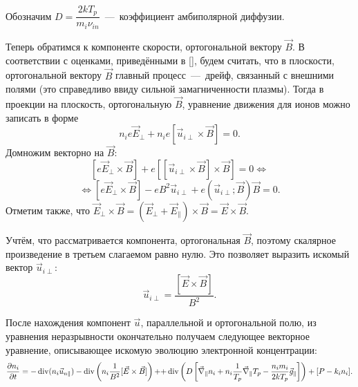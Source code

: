 \documentclass[14pt, a4paper]{extarticle}
\renewcommand{\div}{\operatorname{div}}
\begin{document}
Обозначим $D=\dfrac{2kT_p}{m_i\nu_{in}}$~---~коэффициент амбиполярной диффузии.

Теперь обратимся к компоненте скорости, ортогональной вектору $\vec{B}$. В соответствии с оценками, приведёнными в [], будем считать, что в плоскости, ортогональной вектору $\vec{B}$ главный процесс~---~дрейф, связанный с внешними полями (это справедливо ввиду сильной замагниченности плазмы). Тогда в проекции на плоскость, ортогональную $\vec{B}$, уравнение движения для ионов можно записать в форме 
\begin{equation}
n_ie\vec{E}_\perp + n_ie[\vec{u}_{i\perp}\times \vec{B}]=0.
\end{equation}
Домножим векторно на $\vec{B}$: $$[e\vec{E}_\perp\times\vec{B}]+e[[\vec{u}_{i\perp}\times\vec{B}]\times\vec{B}]=0\Leftrightarrow$$ $$\Leftrightarrow[e\vec{E}_\perp\times\vec{B}]-eB^2\vec{u}_{i\perp}+e(\vec{u}_{i\perp};\vec{B})\vec{B}=0.$$
Отметим также, что $\vec{E}_\perp\times \vec{B} = (\vec{E}_\perp+\vec{E}_\parallel)\times \vec{B} = \vec{E}\times\vec{B}$.

Учтём, что рассматривается компонента, ортогональная $\vec{B}$, поэтому скалярное произведение в третьем слагаемом равно нулю. Это позволяет выразить искомый вектор $\vec{u}_{i\perp}$: 
\begin{equation}
\vec{u}_{i\perp}=\dfrac{[\vec{E}\times\vec{B}]}{B^2}.
\end{equation}

После нахождения компонент $\vec{u}$, параллельной и ортогональной полю, из уравнения неразрывности окончательно получаем следующее векторное уравнение, описывающее искомую эволюцию электронной концентрации: \begin{equation}\label{general_eq}
\dfrac{\partial n_i}{\partial t} = -\div(n_i \vec{u}_{n\parallel})-\div\left(n_i\dfrac{1}{B^2}[\vec{E}\times \vec{B}] \right)+$$ $$+\div\left(D\left[\vec{\nabla}_\parallel n_i +n_i\dfrac{1}{T_p}\vec{\nabla}_\parallel T_p - \dfrac{n_i m_i}{2kT_p}\vec{g}_\parallel\right]\right)+[P-k_in_i].
\end{equation}





\end{document}
